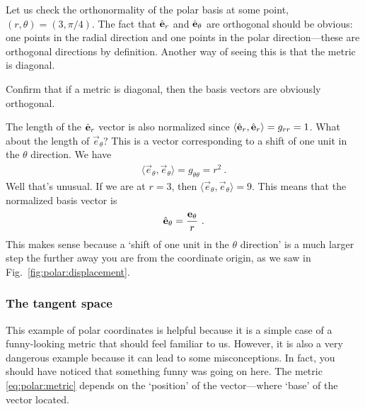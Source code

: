 \documentclass[12pt]{article}
\begin{document}
Let us check the orthonormality of the polar basis at some point, $(r,\theta) = (3,\pi/4)$. The fact that $\hat{\mathbf{e}}_r$ and $\hat{\mathbf{e}}_\theta$ are orthogonal should be obvious: one points in the radial direction and one points in the polar direction---these are orthogonal directions by definition. Another way of seeing this is that the metric is diagonal. 
\begin{exercise}
Confirm that if a metric is diagonal, then the basis vectors are obviously orthogonal. 
\end{exercise}
The length of the $\hat{\mathbf{e}}_r$ vector is also normalized since $\langle \hat{\mathbf{e}}_r, \hat{\mathbf{e}}_r\rangle = g_{rr} = 1$. What about the length of $\vec{e}_\theta$? This is a vector corresponding to a shift of one unit in the $\theta$ direction. We have
\begin{align}
    \langle \vec{e}_\theta, \vec{e}_\theta \rangle = g_{\theta\theta} = r^2 \ .
\end{align}
Well that's unusual. If we are at $r=3$, then $\langle \vec{e}_\theta, \vec{e}_\theta \rangle = 9$. This means that the normalized basis vector is
\begin{align}
    \hat{\mathbf{e}}_\theta = \frac{\mathbf{e}_\theta}{r} \ .
\end{align}
This makes sense because a `shift of one unit in the $\theta$ direction' is a much larger step the further away you are from the coordinate origin, as we saw in Fig.~\ref{fig:polar:displacement}.




\subsubsection{The tangent space}
\label{sec:polar:tangent:space}

This example of polar coordinates is helpful because it is a simple case of a funny-looking metric that should feel familiar to us. However, it is also a very dangerous example because it can lead to some misconceptions. In fact, you should have noticed that something funny was going on here. The metric \eqref{eq:polar:metric} depends on the `position' of the vector---where `base' of the vector located. 
\end{document}
